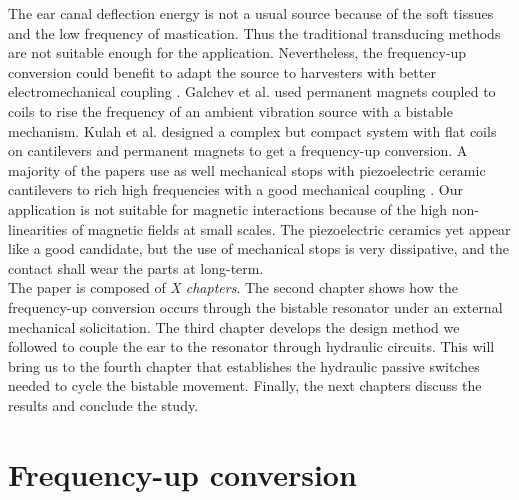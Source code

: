 \documentclass[3p,twocolumn,preprint]{elsarticle}
\begin{document}
The ear canal deflection energy is not a usual source because of the soft tissues and the low frequency of mastication. Thus the traditional transducing methods are not suitable enough for the application. Nevertheless, the frequency-up conversion could benefit to adapt the source to harvesters with better electromechanical coupling \cite{Ashraf2011}. Galchev et al. \cite{Galchev2009} used permanent magnets coupled to coils to rise the frequency of an ambient vibration source with a bistable mechanism. Kulah et al. \cite{Kulah2008} designed a complex but compact system with flat coils on cantilevers and permanent magnets to get a frequency-up conversion. A majority of the papers use as well mechanical stops with piezoelectric ceramic cantilevers to rich high frequencies with a good mechanical coupling \cite{Edwards2013,Gu2011,Lee2007}. Our application is not suitable for magnetic interactions because of the high non-linearities of magnetic fields at small scales. The piezoelectric ceramics yet appear like a good candidate, but the use of mechanical stops is very dissipative, and the contact shall wear the parts at long-term.\\
The paper is composed of \emph{X chapters}. The second chapter shows how the frequency-up conversion occurs through the bistable resonator under an external mechanical solicitation. The third chapter develops the design method we followed to couple the ear to the resonator through hydraulic circuits. This will bring us to the fourth chapter that establishes the hydraulic passive switches needed to cycle the bistable movement. Finally, the next chapters discuss the results and conclude the study.

\newpage
\section{Frequency-up conversion}
\end{document}

